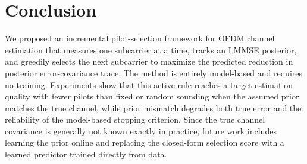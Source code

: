 \section{Conclusion}
\label{sec:conclusion}

We proposed an incremental pilot-selection framework for OFDM channel estimation that measures one subcarrier at a time, tracks an LMMSE posterior, and greedily selects the next subcarrier to maximize the predicted reduction in posterior error-covariance trace. The method is entirely model-based and requires no training. Experiments show that this active rule reaches a target estimation quality with fewer pilots than fixed or random sounding when the assumed prior matches the true channel, while prior mismatch degrades both true error and the reliability of the model-based stopping criterion. Since the true channel covariance is generally not known exactly in practice, future work includes learning the prior online and replacing the closed-form selection score with a learned predictor trained directly from data.
